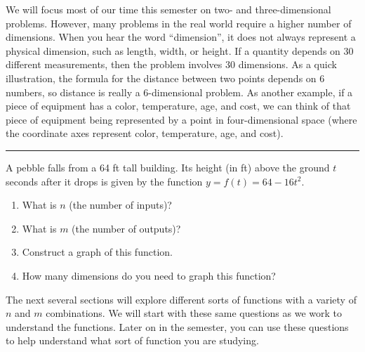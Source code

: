 We will focus most of our time this semester on two- and three-dimensional problems. However, many problems in the real world require a higher number of dimensions. When you hear the word ``dimension'', it does not always represent a physical dimension, such as length, width, or height.  If a quantity depends on 30 different measurements, then the problem involves 30 dimensions.  As a quick illustration, the formula for the distance between two points depends on 6 numbers, so distance is really a 6-dimensional problem.  As another example, if a piece of equipment has a color, temperature, age, and cost, we can think of that piece of equipment being represented by a point in four-dimensional space (where the coordinate axes represent color, temperature, age, and cost).

\hrule

\begin{problem}\label{prob:pebble}
%

A pebble falls from a 64 ft tall building.  Its height (in ft) above the ground $t$ seconds after it drops is given by the function $y=f(t)=64-16t^2$.
\begin{enumerate}
	\item What is $n$ (the number of inputs)?
	\item What is $m$ (the number of outputs)?
	\item Construct a graph of this function.
	\item How many dimensions do you need to graph this function?
\end{enumerate}

\end{problem}

The next several sections will explore different sorts of functions with a variety of $n$ and $m$ combinations. We will start with these same questions as we work to understand the functions. Later on in the semester, you can use these questions to help understand what sort of function you are studying.

